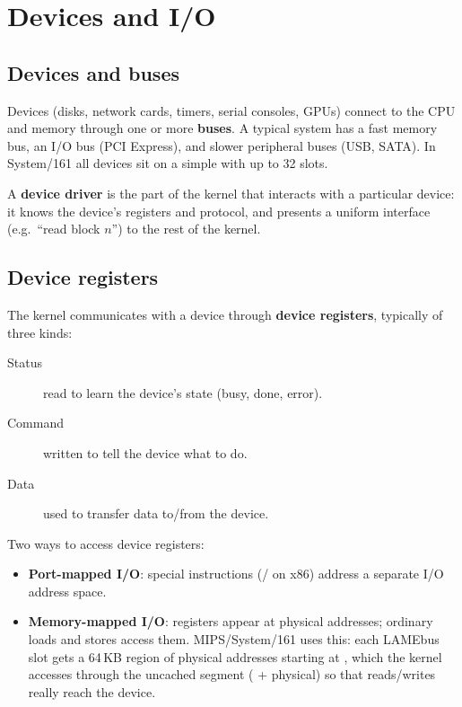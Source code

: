 \chapter{Devices and I/O}

\section{Devices and buses}

Devices (disks, network cards, timers, serial consoles, GPUs) connect to the CPU and memory
through one or more \textbf{buses}. A typical system has a fast memory bus, an I/O bus
(PCI Express), and slower peripheral buses (USB, SATA). In System/161 all devices sit on a
simple  with up to 32 slots.

\begin{definition}
A \textbf{device driver} is the part of the kernel that interacts with a particular device: it
knows the device's registers and protocol, and presents a uniform interface (e.g.\ ``read block
$n$'') to the rest of the kernel.
\end{definition}

\section{Device registers}

The kernel communicates with a device through \textbf{device registers}, typically of three
kinds:
\begin{description}
  \item[Status] read to learn the device's state (busy, done, error).
  \item[Command] written to tell the device what to do.
  \item[Data] used to transfer data to/from the device.
\end{description}

Two ways to access device registers:
\begin{itemize}
  \item \textbf{Port-mapped I/O}: special instructions (/ on x86) address a
    separate I/O address space.
  \item \textbf{Memory-mapped I/O}: registers appear at physical addresses; ordinary loads and
    stores access them. MIPS/System/161 uses this: each LAMEbus slot gets a 64\,KB region of
    physical addresses starting at , which the kernel accesses through the
    uncached segment  ( + physical) so that reads/writes really reach
    the device.
\end{itemize}

